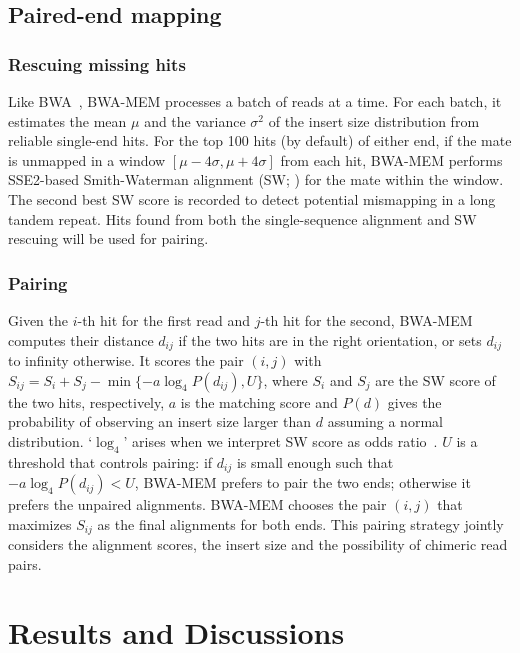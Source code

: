 \documentclass{bioinfo}
\begin{document}
\begin{methods}
\subsection{Paired-end mapping}

\subsubsection{Rescuing missing hits}
Like BWA~\citep{Li:2009uq}, BWA-MEM processes a batch of reads at a time.
For each batch, it estimates the mean $\mu$ and the variance $\sigma^2$
of the insert size distribution from reliable single-end hits. For the
top 100 hits (by default) of either end, if the mate is unmapped in
a window $[\mu-4\sigma,\mu+4\sigma]$ from each hit, BWA-MEM performs SSE2-based
Smith-Waterman alignment (SW; \citealt{Farrar:2007hs}) for the mate within the
window. The second best SW score is recorded to detect potential mismapping in
a long tandem repeat. Hits found from both the single-sequence alignment and SW
rescuing will be used for pairing. %

\subsubsection{Pairing} Given the $i$-th hit for the first read and $j$-th hit
for the second, BWA-MEM computes their distance $d_{ij}$ if the two hits are in
the right orientation, or sets $d_{ij}$ to infinity otherwise. It scores the
pair $(i,j)$ with $S_{ij}=S_i+S_j-\min\{-a\log_4 P(d_{ij}),U\}$, where $S_i$
and $S_j$ are the SW score of the two hits, respectively, $a$ is the matching
score and $P(d)$ gives the probability of observing an insert size larger than
$d$ assuming a normal distribution. `$\log_4$' arises when we interpret SW
score as odds ratio~\citep{Durbin:1998uq}. $U$ is a threshold that controls
pairing: if $d_{ij}$ is small enough such that $-a\log_4 P(d_{ij})<U$, BWA-MEM
prefers to pair the two ends; otherwise it prefers the unpaired alignments.
BWA-MEM chooses the pair $(i,j)$ that maximizes $S_{ij}$ as the final
alignments for both ends.  This pairing strategy jointly considers the
alignment scores, the insert size and the possibility of chimeric read pairs.

\end{methods}

\section{Results and Discussions}
\end{document}
